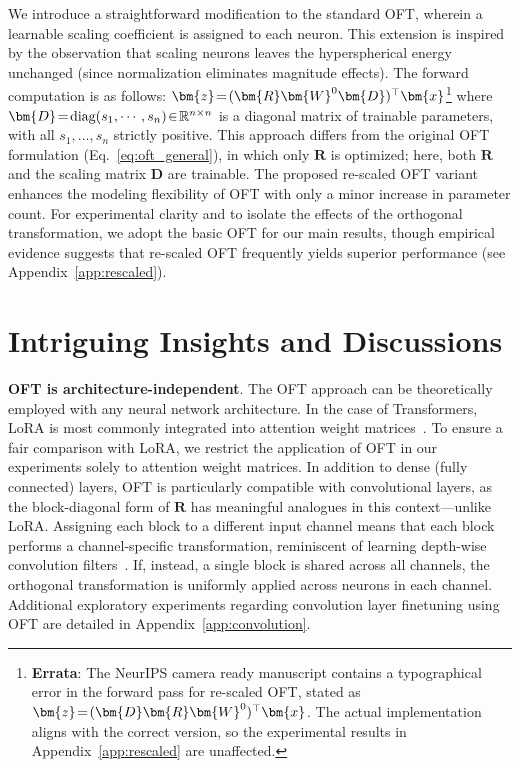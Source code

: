 {We introduce a straightforward modification to the standard OFT, wherein a learnable scaling coefficient is assigned to each neuron. This extension is inspired by the observation that scaling neurons leaves the hyperspherical energy unchanged (since normalization eliminates magnitude effects). The forward computation is as follows: $\thickmuskip=2mu \medmuskip=2mu\bm{z}=(\bm{R}\bm{W}^0\bm{D})^\top\bm{x}$\footnote{\textbf{Errata}: The NeurIPS camera ready manuscript contains a typographical error in the forward pass for re-scaled OFT, stated as $\thickmuskip=2mu \medmuskip=2mu\bm{z}=(\bm{D}\bm{R}\bm{W}^0)^\top\bm{x}$. The actual implementation aligns with the correct version, so the experimental results in Appendix~\ref{app:rescaled} are unaffected.} where $\thickmuskip=2mu \medmuskip=2mu \bm{D}=\text{diag}(s_1,\cdots,s_n)\in\mathbb{R}^{n\times n}$ is a diagonal matrix of trainable parameters, with all $s_1,\ldots,s_n$ strictly positive. This approach differs from the original OFT formulation (Eq.~\eqref{eq:oft_general}), in which only $\bm{R}$ is optimized; here, both $\bm{R}$ and the scaling matrix $\bm{D}$ are trainable. The proposed re-scaled OFT variant enhances the modeling flexibility of OFT with only a minor increase in parameter count. For experimental clarity and to isolate the effects of the orthogonal transformation, we adopt the basic OFT for our main results, though empirical evidence suggests that re-scaled OFT frequently yields superior performance (see Appendix~\ref{app:rescaled}).

\section{Intriguing Insights and Discussions}

\textbf{OFT is architecture-independent}. The OFT approach can be theoretically employed with any neural network architecture. In the case of Transformers, LoRA is most commonly integrated into attention weight matrices~\cite{hulora2022}. To ensure a fair comparison with LoRA, we restrict the application of OFT in our experiments solely to attention weight matrices. In addition to dense (fully connected) layers, OFT is particularly compatible with convolutional layers, as the block-diagonal form of $\bm{R}$ has meaningful analogues in this context—unlike LoRA. Assigning each block to a different input channel means that each block performs a channel-specific transformation, reminiscent of learning depth-wise convolution filters~\cite{chollet2017xception}. If, instead, a single block is shared across all channels, the orthogonal transformation is uniformly applied across neurons in each channel. Additional exploratory experiments regarding convolution layer finetuning using OFT are detailed in Appendix~\ref{app:convolution}.

}
